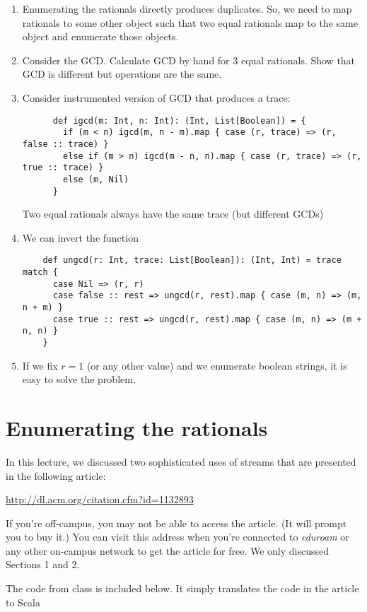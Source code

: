 \begin{instructor}
\begin{enumerate}
  \item Enumerating the rationals directly produces duplicates. So, we
    need to map rationals to some other object such that two equal rationals map to the
    same object and enumerate those objects.

  \item Consider the GCD. Calculate GCD by hand for 3 equal rationals. Show that GCD is different
    but operations are the same.

  \item Consider instrumented version of GCD that produces a trace:

    \begin{lstlisting}
      def igcd(m: Int, n: Int): (Int, List[Boolean]) = {
        if (m < n) igcd(m, n - m).map { case (r, trace) => (r, false :: trace) }
        else if (m > n) igcd(m - n, n).map { case (r, trace) => (r, true :: trace) }
        else (m, Nil)
      }
    \end{lstlisting}

    Two equal rationals always have the same trace (but different GCDs)

  \item We can invert the function

    \begin{lstlisting}
    def ungcd(r: Int, trace: List[Boolean]): (Int, Int) = trace match {
      case Nil => (r, r)
      case false :: rest => ungcd(r, rest).map { case (m, n) => (m, n + m) }
      case true :: rest => ungcd(r, rest).map { case (m, n) => (m + n, n) }
    }
    \end{lstlisting}

  \item If we fix $r = 1$ (or any other value) and we enumerate boolean strings, it is easy to
    solve the problem.

  \end{enumerate}

\end{instructor}

\section{Enumerating the rationals}

In this lecture, we discussed two sophisticated uses of streams that are presented in the following
article:

\href{http://dl.acm.org/citation.cfm?id=1132893}{http://dl.acm.org/citation.cfm?id=1132893}

If you're off-campus, you may not be able to access the article. (It will prompt you to buy it.) You can visit this address
when you're connected to \emph{eduroam} or any other on-campus network to get the article for free. We only discussed Sections 1 and 2.

The code from class is included below. It simply translates the code in the article to Scala

